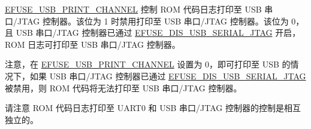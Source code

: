 \documentclass[main\_\_CN.tex]{subfiles}
\begin{document}
\hyperref[fielddesc:EFUSEUSBPRINTCHANNEL]{EFUSE\_USB\_PRINT\_CHANNEL} 控制 ROM 代码日志打印至 USB 串口/JTAG 控制器。该位为 1 时禁用打印至 USB 串口/JTAG 控制器。该位为 0，且 USB 串口/JTAG 控制器已通过 \hyperref[fielddesc:EFUSEDISUSBSERIALJTAG]{EFUSE\_DIS\_USB\_SERIAL\_JTAG} 开启，ROM 日志可打印至 USB 串口/JTAG 控制器。

注意，在 \hyperref[fielddesc:EFUSEUSBPRINTCHANNEL]{EFUSE\_USB\_PRINT\_CHANNEL} 设置为 0，即可打印至 USB 的情况下，如果 USB 串口/JTAG 控制器已通过 \hyperref[fielddesc:EFUSEDISUSBSERIALJTAG]{EFUSE\_DIS\_USB\_SERIAL\_JTAG} 被禁用，则 ROM 代码将无法打印至 USB 串口/JTAG 控制器。

请注意 ROM 代码日志打印至 UART0 和 USB 串口/JTAG 控制器的控制是相互独立的。
\end{document}
